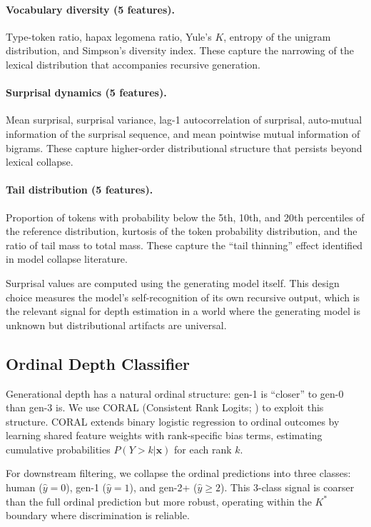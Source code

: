 \documentclass[11pt,a4paper]{article}
\begin{document}
\paragraph{Vocabulary diversity (5 features).}
Type-token ratio, hapax legomena ratio, Yule's $K$, entropy of the unigram distribution, and Simpson's diversity index. These capture the narrowing of the lexical distribution that accompanies recursive generation.

\paragraph{Surprisal dynamics (5 features).}
Mean surprisal, surprisal variance, lag-1 autocorrelation of surprisal, auto-mutual information of the surprisal sequence, and mean pointwise mutual information of bigrams. These capture higher-order distributional structure that persists beyond lexical collapse.

\paragraph{Tail distribution (5 features).}
Proportion of tokens with probability below the 5th, 10th, and 20th percentiles of the reference distribution, kurtosis of the token probability distribution, and the ratio of tail mass to total mass. These capture the ``tail thinning'' effect identified in model collapse literature.

Surprisal values are computed using the generating model itself. This design choice measures the model's self-recognition of its own recursive output, which is the relevant signal for depth estimation in a world where the generating model is unknown but distributional artifacts are universal.

\subsection{Ordinal Depth Classifier}
\label{sec:classifier}

Generational depth has a natural ordinal structure: gen-1 is ``closer'' to gen-0 than gen-3 is. We use CORAL (Consistent Rank Logits; \citealp{cao2020coral}) to exploit this structure. CORAL extends binary logistic regression to ordinal outcomes by learning shared feature weights with rank-specific bias terms, estimating cumulative probabilities $P(Y > k | \mathbf{x})$ for each rank $k$.

For downstream filtering, we collapse the ordinal predictions into three classes: human ($\hat{y}{=}0$), gen-1 ($\hat{y}{=}1$), and gen-2+ ($\hat{y}{\geq}2$). This 3-class signal is coarser than the full ordinal prediction but more robust, operating within the $K^*$ boundary where discrimination is reliable.
\end{document}

